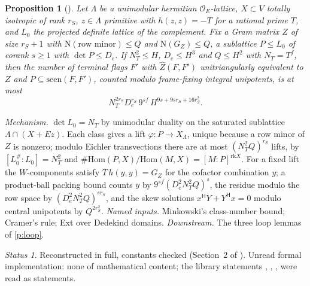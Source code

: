 \documentclass[11pt]{article}
\newcommand{\Ok}{\mathcal O}
\newcommand{\N}{\mathrm N}
\newtheorem{prop}{Proposition}
\theoremstyle{remark}
\newtheorem*{status}{Status}
\begin{document}
\begin{prop}[]\label{p:ct}
Let $\Lambda$ be a unimodular hermitian $\Ok_E$-lattice, $X\subset V$ totally isotropic of rank $r_S$, $z\in\Lambda$ primitive with $h(z,z)=-T$ for a rational prime $T$, and $L_0$ the projected definite lattice of the complement. Fix a Gram matrix $Z$ of size $r_S+1$ with $\N(\text{row minor})\le Q$ and $\N(G_Z)\le Q$, a sublattice $P\le L_0$ of corank $s\ge1$ with $\det P\le D_e$. If $N_T^2\le H$, $D_e\le H^3$ and $Q\le H^2$ with $N_T=T^f$, then the number of terminal flags $F'$ with $\hat Z(F,F')$ unitriangularly equivalent to $Z$ and $P\subseteq\mathrm{seen}(F,F')$, counted modulo frame-fixing integral unipotents, is at most
\[
N_T^{2r_S}D_e^{r_S}\,9^{sf}\,H^{9s+9sr_S+16r_S^2}.
\]
\end{prop}
\emph{Mechanism.} $\det L_0=N_T$ by unimodular duality on the saturated sublattice $\Lambda\cap(X+Ez)$. Each class gives a lift $\varphi\colon P\to X_\Lambda$, unique because a row minor of $Z$ is nonzero; modulo Eichler transvections there are at most $(N_T^2Q)^{r_S}$ lifts, by $[L_0^\#:L_0]=N_T^2$ and $\#\mathrm{Hom}(P,X)/\mathrm{Hom}(M,X)=[M:P]^{\mathrm{rk}X}$. For a fixed lift the $W$-components satisfy $T\,h(y,y)=G_Z$ for the cofactor combination $y$; a product-ball packing bound counts $y$ by $9^{sf}(D_e^2N_T^2Q)^{s}$, the residue modulo the row space by $(D_e^2N_T^2Q)^{sr_S}$, and the skew solutions $x^{\mathsf H}Y+Y^{\mathsf H}x=0$ modulo central unipotents by $Q^{2r_S^2}$.
\emph{Named inputs.} Minkowski's class-number bound; Cramer's rule; Ext over Dedekind domains.
\emph{Downstream.} The three loop lemmas of \ref{p:loop}.
\begin{status}Reconstructed in full, constants checked (Section~2 of ). Unread formal implementation: none of mathematical content; the library statements , , ,  were read as statements.\end{status}
\end{document}
